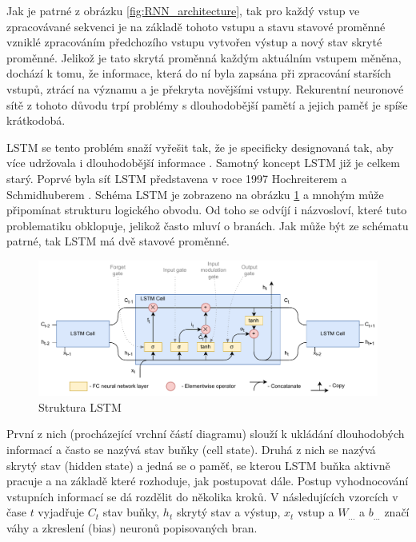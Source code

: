 Jak je patrné z obrázku \ref{fig:RNN_architecture}, tak pro každý vstup ve zpracovávané sekvenci je na základě tohoto vstupu a stavu stavové proměnné vzniklé zpracováním předchozího vstupu vytvořen výstup a nový stav skryté proměnné.
Jelikož je tato skrytá proměnná každým aktuálním vstupem měněna, dochází k tomu, že informace, která do ní byla zapsána při zpracování starších vstupů, ztrácí na významu a je překryta novějšími vstupy.
Rekurentní neuronové sítě z tohoto důvodu trpí problémy s dlouhodobější pamětí a jejich paměť je spíše krátkodobá.

LSTM se tento problém snaží vyřešit tak, že je specificky designovaná tak, aby více udržovala i dlouhodobější informace \cite{understaning_lstm}.
Samotný koncept LSTM již je celkem starý.
Poprvé byla síť LSTM představena v roce 1997 Hochreiterem a Schmidhuberem \cite{LSTM}.
Schéma LSTM je zobrazeno na obrázku \ref{fig:LSTM_architecture} a mnohým může připomínat strukturu logického obvodu.
Od toho se odvíjí i názvosloví, které tuto problematiku obklopuje, jelikož často mluví o branách.
Jak může být ze schématu patrné, tak LSTM má dvě stavové proměnné.

\begin{figure}[h!]
	\centering
	\includegraphics[width=\textwidth]{Figures/solution/LSTM_diagram.pdf}
	\caption{Struktura LSTM}
	\label{fig:LSTM_architecture}
\end{figure}



První z nich (procházející vrchní částí diagramu) slouží k ukládání dlouhodobých informací a často se nazývá stav buňky (cell state). Druhá z nich se nazývá skrytý stav (hidden state) a jedná se o paměť, se kterou LSTM buňka aktivně pracuje a na základě které rozhoduje, jak postupovat dále.
Postup vyhodnocování vstupních informací se dá rozdělit do několika kroků.
V následujících vzorcích v čase \(t\) vyjadřuje \(C_t\) stav buňky, \(h_t\) skrytý stav a výstup, \(x_t\) vstup a \(W_{...}\) a \(b_{...}\) značí váhy a zkreslení (bias) neuronů popisovaných bran.

